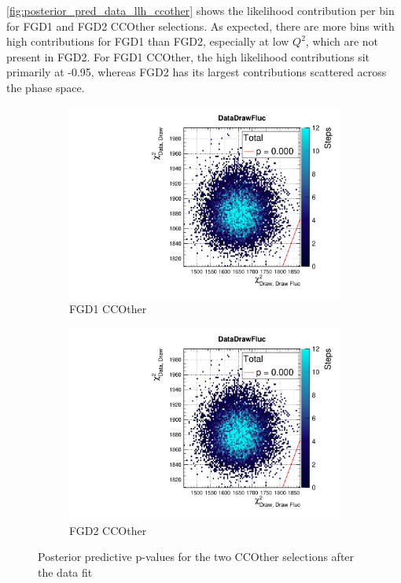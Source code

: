\autoref{fig:posterior_pred_data_llh_ccother} shows the likelihood contribution per bin for FGD1 and FGD2 CCOther selections. As expected, there are more bins with high contributions for FGD1 than FGD2, especially at low $Q^2$, which are not present in FGD2. For FGD1 CCOther, the high likelihood contributions sit primarily at -0.95, whereas FGD2 has its largest contributions scattered across the phase space.
\begin{figure}[h]
	\begin{subfigure}[t]{0.49\textwidth}
		\includegraphics[width=\textwidth, trim={0mm 6mm 0mm 11mm}, clip,page=21]{figures/mach3/data/postpred/2017b_NewData_NewDet_UpdXsecStep_2Xsec_4Det_5Flux_0_PostPred_procs}
		\caption{FGD1 CCOther}
	\end{subfigure}
	\begin{subfigure}[t]{0.49\textwidth}
		\includegraphics[width=\textwidth, trim={0mm 6mm 0mm 11mm}, clip,page=48]{figures/mach3/data/postpred/2017b_NewData_NewDet_UpdXsecStep_2Xsec_4Det_5Flux_0_PostPred_procs}
		\caption{FGD2 CCOther}
	\end{subfigure}
\caption{Posterior predictive p-values for the two CCOther selections after the data fit}
\label{fig:posterior_pred_data_llh_ccother}
\end{figure}

